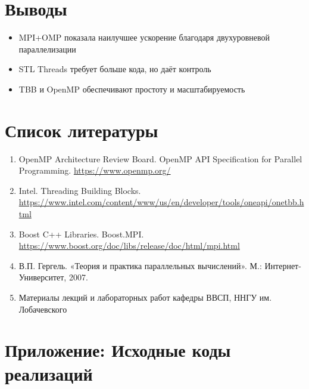 \documentclass[12pt]{article}
\begin{document}
\section{Выводы}
\begin{itemize}
  \item MPI+OMP показала наилучшее ускорение благодаря двухуровневой параллелизации
  \item STL Threads требует больше кода, но даёт контроль
  \item TBB и OpenMP обеспечивают простоту и масштабируемость
\end{itemize}

\section*{Список литературы}
\begin{enumerate}
  \item OpenMP Architecture Review Board. OpenMP API Specification for Parallel Programming. \url{https://www.openmp.org/}
  \item Intel. Threading Building Blocks. \url{https://www.intel.com/content/www/us/en/developer/tools/oneapi/onetbb.html}
  \item Boost C++ Libraries. Boost.MPI. \url{https://www.boost.org/doc/libs/release/doc/html/mpi.html}
  \item В.П. Гергель. «Теория и практика параллельных вычислений». М.: Интернет-Университет, 2007.
  \item Материалы лекций и лабораторных работ кафедры ВВСП, ННГУ им. Лобачевского
\end{enumerate}

\newpage
\appendix
\section*{Приложение: Исходные коды реализаций}
\end{document}
